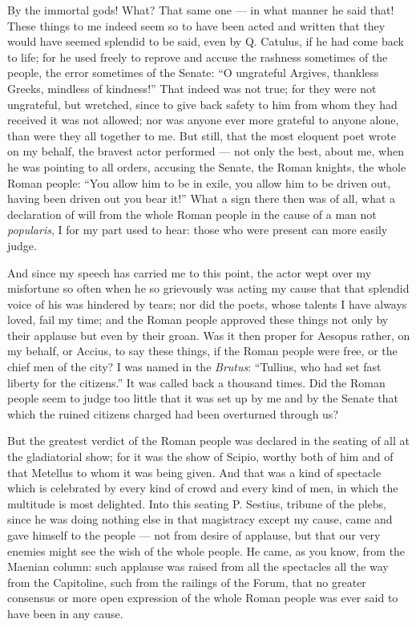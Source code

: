  By the immortal gods! What? That same one --- in what manner he said that! These things to me indeed seem so to have been acted and written that they would have seemed splendid to be said, even by Q. Catulus, if he had come back to life; for he used freely to reprove and accuse the rashness sometimes of the people, the error sometimes of the Senate: ``O ungrateful Argives, thankless Greeks, mindless of kindness!'' That indeed was not true; for they were not ungrateful, but wretched, since to give back safety to him from whom they had received it was not allowed; nor was anyone ever more grateful to anyone alone, than were they all together to me. But still, that the most eloquent poet wrote on my behalf, the bravest actor performed --- not only the best, about me, when he was pointing to all orders, accusing the Senate, the Roman knights, the whole Roman people: ``You allow him to be in exile, you allow him to be driven out, having been driven out you bear it!'' What a sign there then was of all, what a declaration of will from the whole Roman people in the cause of a man not \textit{popularis}, I for my part used to hear: those who were present can more easily judge.

 And since my speech has carried me to this point, the actor wept over my misfortune so often when he so grievously was acting my cause that that splendid voice of his was hindered by tears; nor did the poets, whose talents I have always loved, fail my time; and the Roman people approved these things not only by their applause but even by their groan. Was it then proper for Aesopus rather, on my behalf, or Accius, to say these things, if the Roman people were free, or the chief men of the city? I was named in the \textit{Brutus}: ``Tullius, who had set fast liberty for the citizens.'' It was called back a thousand times. Did the Roman people seem to judge too little that it was set up by me and by the Senate that which the ruined citizens charged had been overturned through us?

 But the greatest verdict of the Roman people was declared in the seating of all at the gladiatorial show; for it was the show of Scipio, worthy both of him and of that Metellus to whom it was being given. And that was a kind of spectacle which is celebrated by every kind of crowd and every kind of men, in which the multitude is most delighted. Into this seating P. Sestius, tribune of the plebs, since he was doing nothing else in that magistracy except my cause, came and gave himself to the people --- not from desire of applause, but that our very enemies might see the wish of the whole people. He came, as you know, from the Maenian column: such applause was raised from all the spectacles all the way from the Capitoline, such from the railings of the Forum, that no greater consensus or more open expression of the whole Roman people was ever said to have been in any cause.

